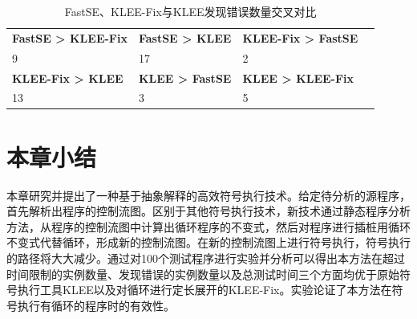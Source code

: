 \begin{table}[ht]
\begin{center}
\caption{FastSE、KLEE-Fix与KLEE发现错误数量交叉对比}
\label{FastSE_KLEE-Fix与KLEE发现错误数量交叉对比}
\begin{tabular}{|l|l|l|l|}
\hline
{\bf FastSE > KLEE-Fix} & {\bf FastSE > KLEE} & {\bf KLEE-Fix > FastSE} \\
9 & 17 & 2 \\ \hline
{\bf KLEE-Fix > KLEE} & {\bf KLEE > FastSE} & {\bf KLEE > KLEE-Fix} \\
13 & 3 & 5\\
\hline
\end{tabular}
\end{center}
\end{table}


%


\section{本章小结}
\label{sec-conclusion}
本章研究并提出了一种基于抽象解释的高效符号执行技术。给定待分析的源程序，首先解析出程序的控制流图。区别于其他符号执行技术，新技术通过静态程序分析方法，从程序的控制流图中计算出循环程序的不变式，然后对程序进行插桩用循环不变式代替循环，形成新的控制流图。在新的控制流图上进行符号执行，符号执行的路径将大大减少。通过对100个测试程序进行实验并分析可以得出本方法在超过时间限制的实例数量、发现错误的实例数量以及总测试时间三个方面均优于原始符号执行工具KLEE以及对循环进行定长展开的KLEE-Fix。实验论证了本方法在符号执行有循环的程序时的有效性。

\afterpage{\blankpage}
